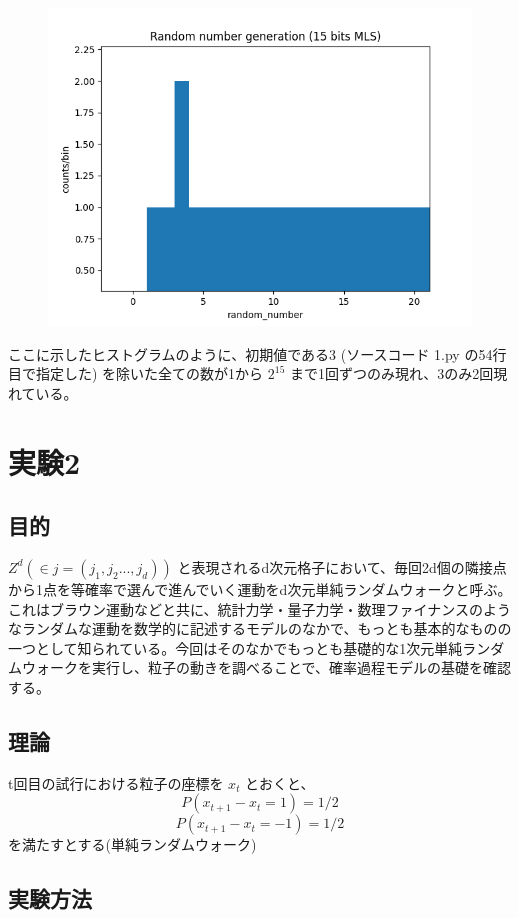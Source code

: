 \documentclass[xelatex,ja=standard]{bxjsarticle}
\begin{document}
\begin{figure}[htbp]
    \centering
    \includegraphics[scale=0.7]
{3-2.png}
    \label{fig:1}
\end{figure}


ここに示したヒストグラムのように、初期値である3 (ソースコード 1.py の54行目で指定した) を除いた全ての数が1から $2^{15}$ まで1回ずつのみ現れ、3のみ2回現れている。


\section{実験2}

\subsection{目的}
$Z^d ( \in j = (j_1,j_2 ... , j_d)) $ と表現されるd次元格子において、毎回2d個の隣接点から1点を等確率で選んで進んでいく運動をd次元単純ランダムウォークと呼ぶ。これはブラウン運動などと共に、統計力学・量子力学・数理ファイナンスのようなランダムな運動を数学的に記述するモデルのなかで、もっとも基本的なものの一つとして知られている。今回はそのなかでもっとも基礎的な1次元単純ランダムウォークを実行し、粒子の動きを調べることで、確率過程モデルの基礎を確認する。
\subsection{理論}
t回目の試行における粒子の座標を $x_t$ とおくと、
\[ 
P(x_{t+1} - x_{t} = 1) = 1/2
\]
\[
P(x_{t+1} - x_{t} = -1) = 1/2
\]
を満たすとする(単純ランダムウォーク)
\subsection{実験方法}
\end{document}
